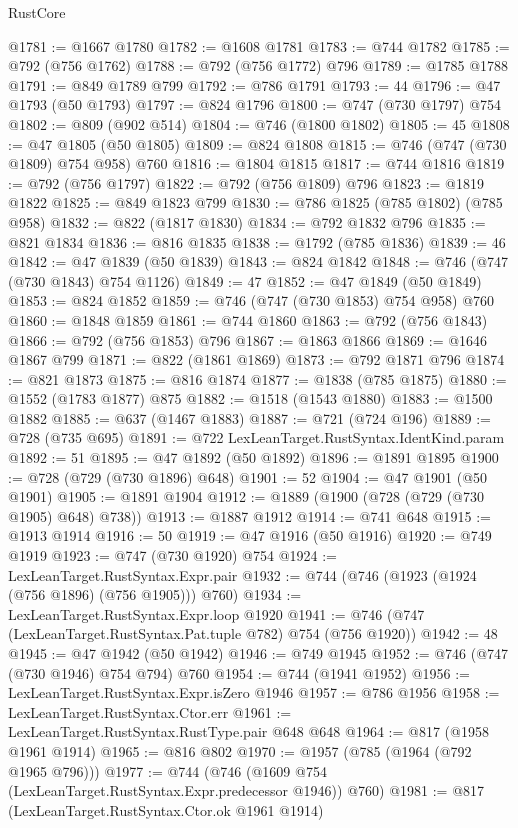 \begin{lexlean}{RustCore}
\begin{coremodule}
@1781 := @1667 @1780
@1782 := @1608 @1781
@1783 := @744 @1782
@1785 := @792 (@756 @1762)
@1788 := @792 (@756 @1772) @796
@1789 := @1785 @1788
@1791 := @849 @1789 @799
@1792 := @786 @1791
@1793 := 44
@1796 := @47 @1793 (@50 @1793)
@1797 := @824 @1796
@1800 := @747 (@730 @1797) @754
@1802 := @809 (@902 @514)
@1804 := @746 (@1800 @1802)
@1805 := 45
@1808 := @47 @1805 (@50 @1805)
@1809 := @824 @1808
@1815 := @746 (@747 (@730 @1809) @754 @958) @760
@1816 := @1804 @1815
@1817 := @744 @1816
@1819 := @792 (@756 @1797)
@1822 := @792 (@756 @1809) @796
@1823 := @1819 @1822
@1825 := @849 @1823 @799
@1830 := @786 @1825 (@785 @1802) (@785 @958)
@1832 := @822 (@1817 @1830)
@1834 := @792 @1832 @796
@1835 := @821 @1834
@1836 := @816 @1835
@1838 := @1792 (@785 @1836)
@1839 := 46
@1842 := @47 @1839 (@50 @1839)
@1843 := @824 @1842
@1848 := @746 (@747 (@730 @1843) @754 @1126)
@1849 := 47
@1852 := @47 @1849 (@50 @1849)
@1853 := @824 @1852
@1859 := @746 (@747 (@730 @1853) @754 @958) @760
@1860 := @1848 @1859
@1861 := @744 @1860
@1863 := @792 (@756 @1843)
@1866 := @792 (@756 @1853) @796
@1867 := @1863 @1866
@1869 := @1646 @1867 @799
@1871 := @822 (@1861 @1869)
@1873 := @792 @1871 @796
@1874 := @821 @1873
@1875 := @816 @1874
@1877 := @1838 (@785 @1875)
@1880 := @1552 (@1783 @1877) @875
@1882 := @1518 (@1543 @1880)
@1883 := @1500 @1882
@1885 := @637 (@1467 @1883)
@1887 := @721 (@724 @196)
@1889 := @728 (@735 @695)
@1891 := @722 LexLeanTarget.RustSyntax.IdentKind.param
@1892 := 51
@1895 := @47 @1892 (@50 @1892)
@1896 := @1891 @1895
@1900 := @728 (@729 (@730 @1896) @648)
@1901 := 52
@1904 := @47 @1901 (@50 @1901)
@1905 := @1891 @1904
@1912 := @1889 (@1900 (@728 (@729 (@730 @1905) @648) @738))
@1913 := @1887 @1912
@1914 := @741 @648
@1915 := @1913 @1914
@1916 := 50
@1919 := @47 @1916 (@50 @1916)
@1920 := @749 @1919
@1923 := @747 (@730 @1920) @754
@1924 := LexLeanTarget.RustSyntax.Expr.pair
@1932 := @744 (@746 (@1923 (@1924 (@756 @1896) (@756 @1905))) @760)
@1934 := LexLeanTarget.RustSyntax.Expr.loop @1920
@1941 := @746 (@747 (LexLeanTarget.RustSyntax.Pat.tuple @782) @754 (@756 @1920))
@1942 := 48
@1945 := @47 @1942 (@50 @1942)
@1946 := @749 @1945
@1952 := @746 (@747 (@730 @1946) @754 @794) @760
@1954 := @744 (@1941 @1952)
@1956 := LexLeanTarget.RustSyntax.Expr.isZero @1946
@1957 := @786 @1956
@1958 := LexLeanTarget.RustSyntax.Ctor.err
@1961 := LexLeanTarget.RustSyntax.RustType.pair @648 @648
@1964 := @817 (@1958 @1961 @1914)
@1965 := @816 @802
@1970 := @1957 (@785 (@1964 (@792 @1965 @796)))
@1977 := @744 (@746 (@1609 @754 (LexLeanTarget.RustSyntax.Expr.predecessor @1946)) @760)
@1981 := @817 (LexLeanTarget.RustSyntax.Ctor.ok @1961 @1914)

\end{coremodule}
\end{lexlean}
